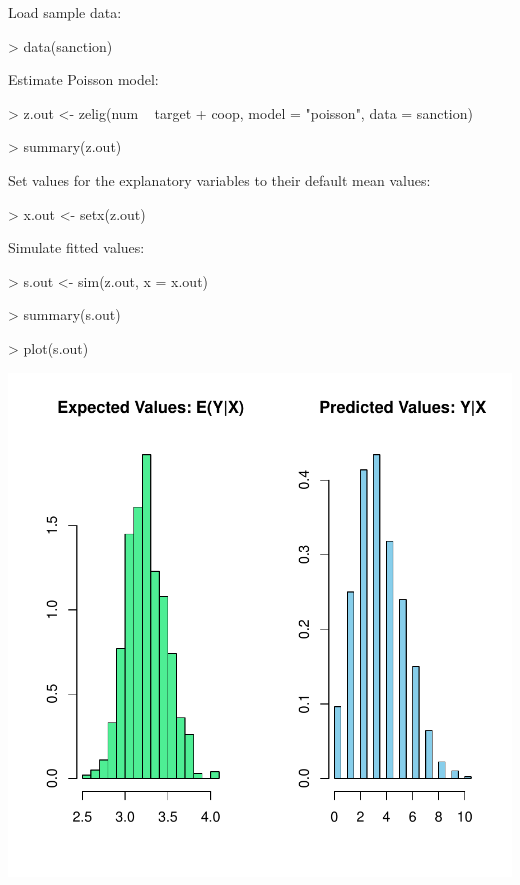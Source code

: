\documentclass{article}
\begin{document}
Load sample data:  
\begin{Schunk}
\begin{Sinput}
> data(sanction)
\end{Sinput}
\end{Schunk}
Estimate Poisson model:  
\begin{Schunk}
\begin{Sinput}
> z.out <- zelig(num ~ target + coop, model = "poisson", data = sanction)
\end{Sinput}
\end{Schunk}
\begin{Schunk}
\begin{Sinput}
> summary(z.out)
\end{Sinput}
\end{Schunk}
Set values for the explanatory variables to their default mean values:  
\begin{Schunk}
\begin{Sinput}
> x.out <- setx(z.out)
\end{Sinput}
\end{Schunk}
Simulate fitted values:  
\begin{Schunk}
\begin{Sinput}
> s.out <- sim(z.out, x = x.out)
\end{Sinput}
\end{Schunk}
\begin{Schunk}
\begin{Sinput}
> summary(s.out)
\end{Sinput}
\end{Schunk}
\begin{center}
\begin{Schunk}
\begin{Sinput}
> plot(s.out)
\end{Sinput}
\end{Schunk}
\includegraphics{vigpics/poisson-ExamplePlot}
\end{center}
\end{document}
